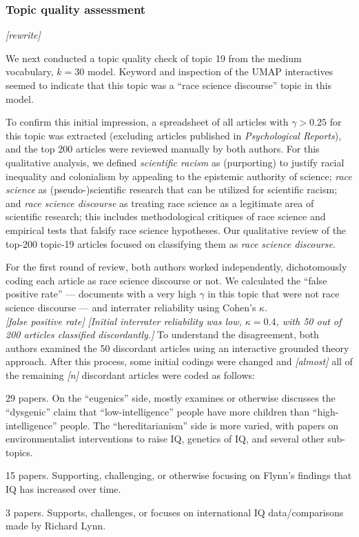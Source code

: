 \documentclass[12pt]{article}
\providecommand{\tightlist}{%
  \setlength{\itemsep}{0pt}\setlength{\parskip}{0pt}}
\begin{document}
\hypertarget{topic-quality-assessment}{%
\subsubsection*{Topic quality
assessment}\label{topic-quality-assessment}}

\emph{{[}rewrite{]}}

We next conducted a topic quality check of topic 19 from the medium
vocabulary, \(k=30\) model. Keyword and inspection of the UMAP
interactives seemed to indicate that this topic was a ``race science
discourse'' topic in this model.

To confirm this initial impression, a spreadsheet of all articles with
\(\gamma > 0.25\) for this topic was extracted (excluding articles
published in \emph{Psychological Reports}), and the top 200 articles
were reviewed manually by both authors. For this qualitative analysis,
we defined \emph{scientific racism} as (purporting) to justify racial
inequality and colonialism by appealing to the epistemic authority of
science; \emph{race science} as (pseudo-)scientific research that can be
utilized for scientific racism; and \emph{race science discourse} as
treating race science as a legitimate area of scientific research; this
includes methodological critiques of race science and empirical tests
that falsify race science hypotheses. Our qualitative review of the
top-200 topic-19 articles focused on classifying them as \emph{race
science discourse}.

For the first round of review, both authors worked independently,
dichotomously coding each article as race science discourse or not. We
calculated the ``false positive rate'' --- documents with a very high
\(\gamma\) in this topic that were not race science discourse --- and
interrater reliability using Cohen's \(\kappa\).\\
\emph{{[}false positive rate{]}} \emph{{[}Initial interrater reliability
was low, \(\kappa = 0.4\), with 50 out of 200 articles classified
discordantly.{]}} To understand the disagreement, both authors examined
the 50 discordant articles using an interactive grounded theory
approach. After this process, some initial codings were changed and
\emph{{[}almost{]}} all of the remaining \emph{{[}n{]}} discordant
articles were coded as follows:

\begin{description}
\tightlist
\item[hereditarianism and/or eugenics]
29 papers. On the ``eugenics'' side, mostly examines or otherwise
discusses the ``dysgenic'' claim that ``low-intelligence'' people have
more children than ``high-intelligence'' people. The ``hereditarianism''
side is more varied, with papers on environmentalist interventions to
raise IQ, genetics of IQ, and several other sub-topics.
\item[Flynn effect]
15 papers. Supporting, challenging, or otherwise focusing on Flynn's
findings that IQ has increased over time.
\item[Lynn/national IQ]
3 papers. Supports, challenges, or focuses on international IQ
data/comparisons made by Richard Lynn.
\end{description}
\end{document}
